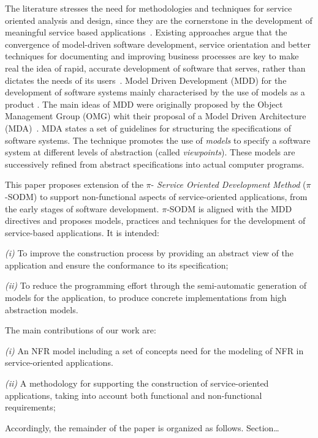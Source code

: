 The literature stresses the need for methodologies and techniques for service oriented analysis and design, since they are the cornerstone in the development of meaningful service based applications~\cite{5}. Existing approaches argue that the convergence of model-driven software development, service orientation and better techniques for documenting and improving business processes are key to make real the idea of rapid, accurate development of software that serves, rather than dictates the needs of its users~\cite{watson}. Model Driven Development (MDD)  for the development of software systems mainly characterised by the use of models as a product \cite{Selic03}.
The main ideas of MDD were originally proposed by the Object Management Group (OMG) whit their proposal of a Model Driven Architecture (MDA)~\cite{miller}. MDA states a set of guidelines for structuring the specifications of software systems. The technique promotes  the use of \textit{models} to specify a software system at different levels of abstraction (called \textit{viewpoints}).
These models are successively refined from abstract specifications into actual computer programs.

This paper proposes  extension of the $\pi$-\textit{ Service Oriented Development Method} ($\pi$-SODM)
to support non-functional aspects of service-oriented applications, from the early stages of software development.
$\pi$-SODM is aligned with the MDD directives and proposes models, practices and techniques for the development of service-based applications. It is intended:
\begin{trivlist}
\item \textit{(i)} To improve the construction process by providing an abstract view of the application and ensure the conformance to its specification;
\item \textit{(ii)} To reduce the programming effort through the semi-automatic generation of  models for the application, to produce concrete implementations from high abstraction models.
\end{trivlist}

The main contributions of our work are:
\begin{trivlist}
\item \textit{(i)} An NFR model including a set of concepts need for the modeling of NFR in service-oriented applications.
\item \textit{(ii)} A methodology for supporting the construction of service-oriented applications, taking into account both functional and non-functional requirements;
\end{trivlist}
Accordingly, the remainder of the paper is organized as follows.
Section\dots





